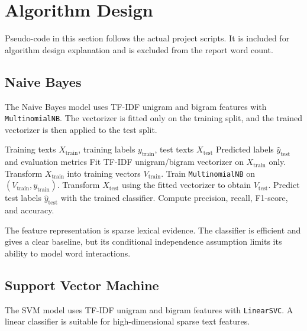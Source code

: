 \section{Algorithm Design}

Pseudo-code in this section follows the actual project scripts. It is included for algorithm design explanation and is excluded from the report word count.

\subsection{Naive Bayes}

The Naive Bayes model uses TF-IDF unigram and bigram features with \texttt{MultinomialNB}. The vectorizer is fitted only on the training split, and the trained vectorizer is then applied to the test split.

\begin{algorithm}[H]
\caption{TF-IDF + Multinomial Naive Bayes}
\label{alg:naive_bayes}
\begin{algorithmic}[1]
\Require Training texts $X_{\text{train}}$, training labels $y_{\text{train}}$, test texts $X_{\text{test}}$
\Ensure Predicted labels $\hat{y}_{\text{test}}$ and evaluation metrics
\State Fit TF-IDF unigram/bigram vectorizer on $X_{\text{train}}$ only.
\State Transform $X_{\text{train}}$ into training vectors $V_{\text{train}}$.
\State Train \texttt{MultinomialNB} on $(V_{\text{train}}, y_{\text{train}})$.
\State Transform $X_{\text{test}}$ using the fitted vectorizer to obtain $V_{\text{test}}$.
\State Predict test labels $\hat{y}_{\text{test}}$ with the trained classifier.
\State Compute precision, recall, F1-score, and accuracy.
\end{algorithmic}
\end{algorithm}

The feature representation is sparse lexical evidence. The classifier is efficient and gives a clear baseline, but its conditional independence assumption limits its ability to model word interactions.

\subsection{Support Vector Machine}

The SVM model uses TF-IDF unigram and bigram features with \texttt{LinearSVC}. A linear classifier is suitable for high-dimensional sparse text features.

